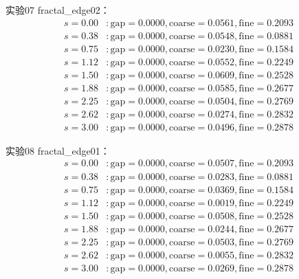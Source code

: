 \documentclass[11pt,a4paper]{book}
\theoremstyle{definition}
\begin{document}
实验07 fractal\_edge02：
\begin{align*}
s=0.00 &: \text{gap}=0.0000, \text{coarse}=0.0561, \text{fine}=0.2093 \\
s=0.38 &: \text{gap}=0.0000, \text{coarse}=0.0548, \text{fine}=0.0881 \\
s=0.75 &: \text{gap}=0.0000, \text{coarse}=0.0230, \text{fine}=0.1584 \\
s=1.12 &: \text{gap}=0.0000, \text{coarse}=0.0552, \text{fine}=0.2249 \\
s=1.50 &: \text{gap}=0.0000, \text{coarse}=0.0609, \text{fine}=0.2528 \\
s=1.88 &: \text{gap}=0.0000, \text{coarse}=0.0585, \text{fine}=0.2677 \\
s=2.25 &: \text{gap}=0.0000, \text{coarse}=0.0504, \text{fine}=0.2769 \\
s=2.62 &: \text{gap}=0.0000, \text{coarse}=0.0274, \text{fine}=0.2832 \\
s=3.00 &: \text{gap}=0.0000, \text{coarse}=0.0496, \text{fine}=0.2878
\end{align*}

实验08 fractal\_edge01：
\begin{align*}
s=0.00 &: \text{gap}=0.0000, \text{coarse}=0.0507, \text{fine}=0.2093 \\
s=0.38 &: \text{gap}=0.0000, \text{coarse}=0.0283, \text{fine}=0.0881 \\
s=0.75 &: \text{gap}=0.0000, \text{coarse}=0.0369, \text{fine}=0.1584 \\
s=1.12 &: \text{gap}=0.0000, \text{coarse}=0.0019, \text{fine}=0.2249 \\
s=1.50 &: \text{gap}=0.0000, \text{coarse}=0.0508, \text{fine}=0.2528 \\
s=1.88 &: \text{gap}=0.0000, \text{coarse}=0.0244, \text{fine}=0.2677 \\
s=2.25 &: \text{gap}=0.0000, \text{coarse}=0.0503, \text{fine}=0.2769 \\
s=2.62 &: \text{gap}=0.0000, \text{coarse}=0.0055, \text{fine}=0.2832 \\
s=3.00 &: \text{gap}=0.0000, \text{coarse}=0.0269, \text{fine}=0.2878
\end{align*}
\end{document}
